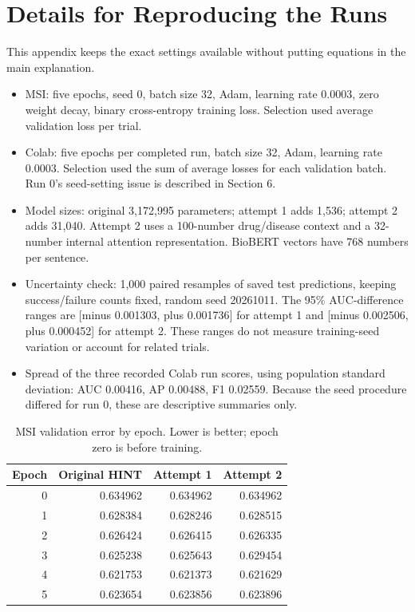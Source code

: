 \documentclass[10pt,letterpaper]{article}
\begin{document}
\section{Details for Reproducing the Runs}
This appendix keeps the exact settings available without putting equations in the main explanation.
\begin{itemize}
\item MSI: five epochs, seed 0, batch size 32, Adam, learning rate 0.0003, zero weight decay, binary cross-entropy training loss. Selection used average validation loss per trial.
\item Colab: five epochs per completed run, batch size 32, Adam, learning rate 0.0003. Selection used the sum of average losses for each validation batch. Run 0's seed-setting issue is described in Section 6.
\item Model sizes: original 3,172,995 parameters; attempt 1 adds 1,536; attempt 2 adds 31,040. Attempt 2 uses a 100-number drug/disease context and a 32-number internal attention representation. BioBERT vectors have 768 numbers per sentence.
\item Uncertainty check: 1,000 paired resamples of saved test predictions, keeping success/failure counts fixed, random seed 20261011. The 95\% AUC-difference ranges are [minus 0.001303, plus 0.001736] for attempt 1 and [minus 0.002506, plus 0.000452] for attempt 2. These ranges do not measure training-seed variation or account for related trials.
\item Spread of the three recorded Colab run scores, using population standard deviation: AUC 0.00416, AP 0.00488, F1 0.02559. Because the seed procedure differed for run 0, these are descriptive summaries only.
\end{itemize}

\begin{table}[H]
\centering
\caption{MSI validation error by epoch. Lower is better; epoch zero is before training.}
\begin{tabular}{rrrr}\toprule
Epoch & Original HINT & Attempt 1 & Attempt 2\\\midrule
0 & 0.634962 & 0.634962 & 0.634962\\
1 & 0.628384 & 0.628246 & 0.628515\\
2 & 0.626424 & 0.626415 & 0.626335\\
3 & 0.625238 & 0.625643 & 0.629454\\
4 & 0.621753 & 0.621373 & 0.621629\\
5 & 0.623654 & 0.623856 & 0.623896\\\bottomrule
\end{tabular}
\end{table}
\end{document}
